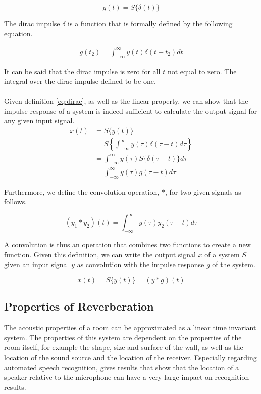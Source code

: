 \[g(t) = S\{\delta(t)\}\]

The dirac impulse $\delta$ is a function that is formally defined by the following equation. 

\begin{align}
g(t_2) = \int_{-\infty}^{\infty} y(t)\delta(t - t_2) dt \label{eq:dirac} 
\end{align}

It can be said that the dirac impulse is zero for all $t$ not equal to zero. The integral over the dirac impulse defined to be one. 
\\ \\
Given definition \ref{eq:dirac}, as well as the linear property, we can show that the impulse response of a system is indeed sufficient to calculate the output signal for any given input signal. 
\begin{align*}
x(t) &= S\{y(t)\} \\
	 &= S\left\{\int_{-\infty}^{\infty} y(\tau)\delta(\tau - t) d\tau \right\} \\
	 &= \int_{-\infty}^{\infty} y(\tau)S\{\delta(\tau - t)\} d\tau \\
	 &= \int_{-\infty}^{\infty} y(\tau)g(\tau - t) d\tau
\end{align*}

Furthermore, we define the convolution operation, $*$, for two given signals as follows.

\[
 (y_1 * y_2)(t) = \int_{-\infty}^{\infty} y(\tau)y_2(\tau - t) d\tau \tag{(convolution)}
\]

A convolution is thus an operation that combines two functions to create a new function. Given this definition, we can write the output signal $x$ of a system $S$ given an input signal $y$ as convolution with the impulse response $g$ of the system. 

\[
x(t) = S\{y(t)\} = (y * g)(t)
\]

\subsection{Properties of Reverberation}

The acoustic properties of a room can be approximated as a linear time invariant system. The properties of this system are dependent on the properties of the room itself, for example the shape, size and surface of the wall, as well as the location of the sound source and the location of the receiver. Especially regarding automated speech recognition, \cite{ritter2016training} gives results that show that the location of a speaker relative to the microphone can have a very large impact on recognition results.

